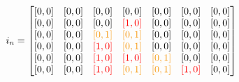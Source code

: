 \documentclass[12pt]{article}
\newcommand{\mathColor}[2]{\color{#1}#2\color{black}}
\newcommand{\gold}{YellowOrange}
\begin{document}
\[
i_n = \left[
\begin{matrix}
\mathColor{black}{[0,0]} & \mathColor{black}{[0,0]} & \mathColor{black}{[0,0]} & \mathColor{black}{[0,0]} & \mathColor{black}{[0,0]} & \mathColor{black}{[0,0]} & \mathColor{black}{[0,0]}\\
\mathColor{black}{[0,0]} & \mathColor{black}{[0,0]} & \mathColor{black}{[0,0]} & \mathColor{red}{[1,0]}     & \mathColor{black}{[0,0]} & \mathColor{black}{[0,0]} & \mathColor{black}{[0,0]}\\
\mathColor{black}{[0,0]} & \mathColor{black}{[0,0]} & \mathColor{\gold}{[0,1]} & \mathColor{\gold}{[0,1]} & \mathColor{black}{[0,0]} & \mathColor{black}{[0,0]} & \mathColor{black}{[0,0]}\\
\mathColor{black}{[0,0]} & \mathColor{black}{[0,0]} & \mathColor{red}{[1,0]}     & \mathColor{\gold}{[0,1]} & \mathColor{black}{[0,0]} & \mathColor{black}{[0,0]} & \mathColor{black}{[0,0]}\\
\mathColor{black}{[0,0]} & \mathColor{black}{[0,0]} & \mathColor{red}{[1,0]}     & \mathColor{red}{[1,0]}     & \mathColor{\gold}{[0,1]} & \mathColor{black}{[0,0]} & \mathColor{black}{[0,0]}\\
\mathColor{black}{[0,0]} & \mathColor{black}{[0,0]} & \mathColor{red}{[1,0]}     & \mathColor{\gold}{[0,1]} & \mathColor{\gold}{[0,1]} & \mathColor{red}{[1,0]}     & \mathColor{black}{[0,0]}\\
\end{matrix}
\right]
\]
\end{document}
